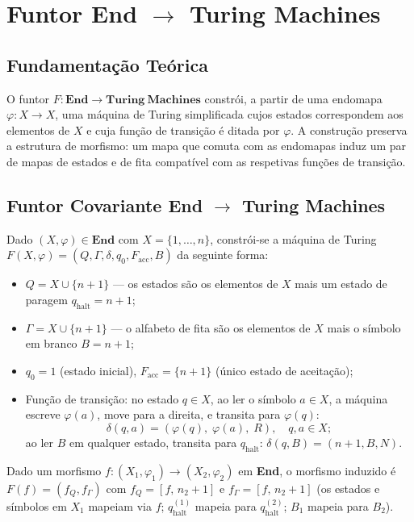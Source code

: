\section{Funtor End $\rightarrow$ Turing Machines}
\label{sec:functor-end-turing}

\subsection{Fundamentação Teórica}

O funtor $F: \mathbf{End} \to \mathbf{Turing\ Machines}$ constrói, a partir de uma endomapa $\varphi: X \to X$, uma máquina de Turing simplificada cujos estados correspondem aos elementos de $X$ e cuja função de transição é ditada por $\varphi$. A construção preserva a estrutura de morfismo: um mapa que comuta com as endomapas induz um par de mapas de estados e de fita compatível com as respetivas funções de transição.

\subsection{Funtor Covariante End $\rightarrow$ Turing Machines}

\begin{definition}
Dado $(X, \varphi) \in \mathbf{End}$ com $X = \{1,\ldots,n\}$, constrói-se a máquina de Turing $F(X,\varphi) = (Q, \Gamma, \delta, q_0, F_{\mathrm{acc}}, B)$ da seguinte forma:
\begin{itemize}
    \item $Q = X \cup \{n{+}1\}$ --- os estados são os elementos de $X$ mais um estado de paragem $q_{\mathrm{halt}} = n{+}1$;
    \item $\Gamma = X \cup \{n{+}1\}$ --- o alfabeto de fita são os elementos de $X$ mais o símbolo em branco $B = n{+}1$;
    \item $q_0 = 1$ (estado inicial), $F_{\mathrm{acc}} = \{n{+}1\}$ (único estado de aceitação);
    \item Função de transição: no estado $q \in X$, ao ler o símbolo $a \in X$, a máquina escreve $\varphi(a)$, move para a direita, e transita para $\varphi(q)$:
    \[
        \delta(q, a) = (\varphi(q),\; \varphi(a),\; R), \quad q, a \in X;
    \]
    ao ler $B$ em qualquer estado, transita para $q_{\mathrm{halt}}$: $\delta(q, B) = (n{+}1, B, N)$.
\end{itemize}
Dado um morfismo $f: (X_1, \varphi_1) \to (X_2, \varphi_2)$ em \textbf{End}, o morfismo induzido é $F(f) = (f_Q, f_\Gamma)$ com $f_Q = [f,\, n_2{+}1]$ e $f_\Gamma = [f,\, n_2{+}1]$ (os estados e símbolos em $X_1$ mapeiam via $f$; $q_{\mathrm{halt}}^{(1)}$ mapeia para $q_{\mathrm{halt}}^{(2)}$; $B_1$ mapeia para $B_2$).
\end{definition}

